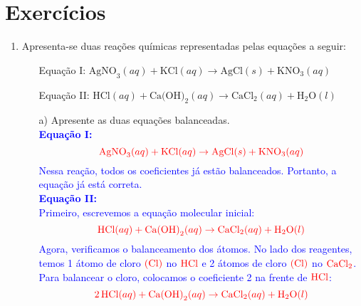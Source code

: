 \documentclass[a4paper, 12pt]{article}
\begin{document}
\section*{Exercícios}
\begin{enumerate}

    \item Apresenta-se duas reações químicas representadas pelas equações a seguir:
          \begin{itemize}
              \item[] Equação I:
                    $\text{AgNO}_{3} (aq) + \text{KCl}(aq) \rightarrow \text{AgCl}(s) + \text{KNO}
                        _{3} (aq)$
              \item[] Equação II:
                    $\text{HCl}(aq) + \text{Ca(OH)}_{2}(aq) \rightarrow \text{CaCl}_{2}(aq)
                        + \text{H}_{2}\text{O}(l)$
          \end{itemize}
          \begin{enumerate}[align=left, labelsep=-0.5em]
              \item[a)] Apresente as duas equações balanceadas.
                    \\[10pt]
                    \textcolor{blue}{\textbf{Equação I:}}
                    \[
                        \textcolor{red}{\text{AgNO}_3 (aq) + \text{KCl} (aq) \rightarrow \text{AgCl} (s) + \text{KNO}_3 (aq)}
                    \]
                    \textcolor{blue}{Nessa reação, todos os coeficientes já estão balanceados. Portanto, a equação já está correta.}
                    \\[10pt]
                    \textcolor{blue}{\textbf{Equação II:}}
                    \\[10pt]
                    \textcolor{blue}{Primeiro, escrevemos a equação molecular inicial:}
                    \[
                        \textcolor{red}{\text{HCl} (aq) + \text{Ca(OH)}_2 (aq) \rightarrow \text{CaCl}_2 (aq) + \text{H}_2\text{O} (l)}
                    \]
                    \textcolor{blue}{Agora, verificamos o balanceamento dos átomos. No lado dos reagentes, temos 1 átomo de cloro \(\textcolor{red}{(\text{Cl})}\) no \(\textcolor{red}{\text{HCl}}\) e 2 átomos de cloro \(\textcolor{red}{(\text{Cl})}\) no \(\textcolor{red}{\text{CaCl}_2}\). Para balancear o cloro, colocamos o coeficiente 2 na frente de \(\textcolor{red}{\text{HCl}}\):}
                    \[
                        \textcolor{red}{2 \, \text{HCl} (aq) + \text{Ca(OH)}_2 (aq) \rightarrow \text{CaCl}_2 (aq) + \text{H}_2\text{O} (l)}
\]
\end{enumerate}
\end{enumerate}
\end{document}
